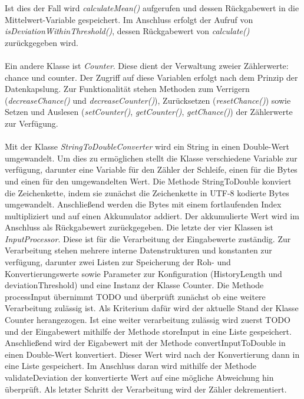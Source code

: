     Ist dies der Fall wird \textit{calculateMean()} aufgerufen und dessen Rückgabewert in die Mittelwert-Variable gespeichert.
    Im Anschluss erfolgt der Aufruf von \textit{isDeviationWithinThreshold()}, dessen Rückgabewert von \textit{calculate()} zurückgegeben wird.\\
    \\
    Ein andere Klasse ist \textit{Counter}.
    Diese dient der Verwaltung zweier Zählerwerte: chance und counter.
    Der Zugriff auf diese Variablen erfolgt nach dem Prinzip der Datenkapslung.
    Zur Funktionalität stehen Methoden zum Verrigern (\textit{decreaseChance()} und \textit{decreaseCounter()}), Zurücksetzen (\textit{resetChance()}) sowie Setzen und Auslesen (\textit{setCounter()}, \textit{getCounter()}, \textit{getChance()}) der Zählerwerte zur Verfügung.\\
    \\
    Mit der Klasse \textit{StringToDoubleConverter} wird ein String in einen Double-Wert umgewandelt.
    Um dies zu ermöglichen stellt die Klasse verschiedene Variable zur verfügung, darunter eine Variable für den Zähler der Schleife, einen für die Bytes und einen für den umgewandelten Wert.
    Die Methode StringToDouble konviert die Zeichenkette, indem sie zunächst die Zeichenkette in UTF-8 kodierte Bytes umgewandelt.
    Anschließend werden die Bytes mit einem fortlaufenden Index multipliziert und auf einen Akkumulator addiert.
    Der akkumulierte Wert wird im Anschluss als Rückgabewert zurückgegeben.
    Die letzte der vier Klassen ist \textit{InputProcessor}.
    Diese ist für die Verarbeitung der Eingabewerte zuständig.
    Zur Verarbeitung stehen mehrere interne Datenstrukturen und konstanten zur verfügung, darunter zwei Listen zur Speicherung der Roh- und Konvertierungswerte sowie Parameter zur Konfiguration (HistoryLength und deviationThreshold) und eine Instanz der Klasse Counter.
    Die Methode processInput übernimmt TODO und überprüft zunächst ob eine weitere Verarbeitung zulässig ist. 
    Als Kriterium dafür wird der aktuelle Stand der Klasse Counter herangezogen.
    Ist eine weiter verarbeitung zulässig wird zuerst TODO und der Eingabewert mithilfe der Methode storeInput in eine Liste gespeichert.
    Anschließend wird der Eigabewert mit der Methode convertInputToDouble in einen Double-Wert konvertiert.
    Dieser Wert wird nach der Konvertierung dann in eine Liste gespeichert.
    Im Anschluss daran wird mithilfe der Methode validateDeviation der konvertierte Wert auf eine mögliche Abweichung hin überprüft.
    Als letzter Schritt der Verarbeitung wird der Zähler dekrementiert.\\
